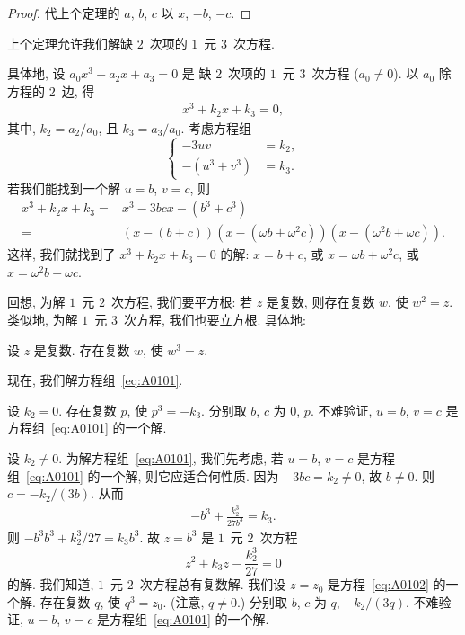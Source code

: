 \documentclass[../libro.tex]{subfiles}
\begin{document}
\begin{proof}
    代上个定理的 \(a\), \(b\), \(c\)
    以 \(x\), \(-b\), \(-c\).
\end{proof}

上个定理允许我们解缺 \(2\)~次项的 \(1\)~元 \(3\)~次方程.

具体地, 设 \(a_0 x^3 + a_2 x + a_3 = 0\) 是%
缺 \(2\)~次项的 \(1\)~元 \(3\)~次方程
(\(a_0 \neq 0\)).
以 \(a_0\) 除方程的 \(2\)~边, 得
\begin{align*}
    x^3 + k_2 x + k_3 = 0,
\end{align*}
其中, \(k_2 = a_2/a_0\), 且 \(k_3 = a_3/a_0\).
考虑方程组
\begin{equation}
    \left\{ %
    \begin{aligned}
        -3uv         & = k_2, \\
        -(u^3 + v^3) & = k_3.
    \end{aligned}
    \right. %
    \label{eq:A0101}
\end{equation}
若我们能找到一个解 \(u = b\), \(v = c\),
则
\begin{align*}
    x^3 + k_2 x + k_3
    = {} &
    x^3 - 3 b c x - (b^3 + c^3)
    \\
    = {} &
    (x - (b + c))
    (x - (\omega b + \omega^2 c))
    (x - (\omega^2 b + \omega c)).
\end{align*}
这样, 我们就找到了 \(x^3 + k_2 x + k_3 = 0\) 的解:
\(x = b + c\),
或 \(x = \omega b + \omega^2 c\),
或 \(x = \omega^2 b + \omega c\).

回想, 为解 \(1\)~元 \(2\)~次方程,
我们要平方根:
若 \(z\) 是复数, 则存在复数 \(w\),
使 \(w^2 = z\).
类似地, 为解 \(1\)~元 \(3\)~次方程,
我们也要立方根.
具体地:

\begin{theorem}
    设 \(z\) 是复数.
    存在复数 \(w\), 使 \(w^3 = z\).
\end{theorem}

现在, 我们解方程组~\eqref{eq:A0101}.

设 \(k_2 = 0\).
存在复数 \(p\), 使 \(p^3 = -k_3\).
分别取 \(b\), \(c\) 为 \(0\), \(p\).
不难验证,
\(u = b\), \(v = c\) 是方程组~\eqref{eq:A0101} 的一个解.

设 \(k_2 \neq 0\).
为解方程组~\eqref{eq:A0101},
我们先考虑, 若 \(u = b\), \(v = c\)
是方程组~\eqref{eq:A0101} 的一个解,
则它应适合何性质.
因为 \(-3 b c = k_2 \neq 0\),
故 \(b \neq 0\).
则 \(c = -k_2 / (3b)\).
从而
\begin{align*}
    -b^3 + \frac{k_2^3}{27 b^3} = k_3.
\end{align*}
则 \(-b^3 b^3 + k_2^3 / 27 = k_3 b^3\).
故 \(z = b^3\) 是 \(1\)~元 \(2\)~次方程
\begin{equation}
    z^2 + k_3 z - \frac{k_2^3}{27} = 0
    \label{eq:A0102}
\end{equation}
的解.
我们知道, \(1\)~元 \(2\)~次方程总有复数解.
我们设 \(z = z_0\)
是方程~\eqref{eq:A0102} 的一个解.
存在复数 \(q\), 使 \(q^3 = z_0\).
(注意, \(q \neq 0\).)
分别取 \(b\), \(c\) 为 \(q\), \(-k_2/(3q)\).
不难验证,
\(u = b\), \(v = c\) 是方程组~\eqref{eq:A0101} 的一个解.
\end{document}
